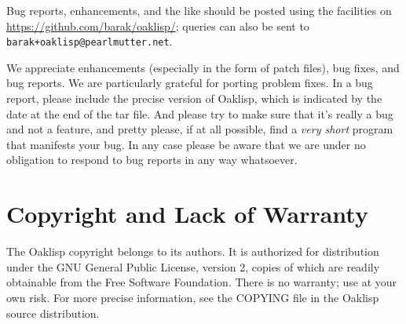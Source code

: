 Bug reports, enhancements, and the like should be posted using the
facilities on \url{https://github.com/barak/oaklisp/}; queries can
also be sent to \texttt{barak+oaklisp@pearlmutter.net}.

We appreciate enhancements (especially in the form of patch files),
bug fixes, and bug reports.  We are particularly grateful for porting
problem fixes.  In a bug report, please include the precise version of
Oaklisp, which is indicated by the date at the end of the tar file.
And please try to make sure that it's really a bug and not a feature,
and pretty please, if at all possible, find a \emph{very short} program
that manifests your bug.  In any case please be aware that we are
under no obligation to respond to bug reports in any way whatsoever.

\section{Copyright and Lack of Warranty}

The Oaklisp copyright belongs to its authors.  It is authorized for
distribution under the GNU General Public License, version 2, copies
of which are readily obtainable from the Free Software Foundation.
There is no warranty; use at your own risk.  For more precise
information, see the COPYING file in the Oaklisp source distribution.
